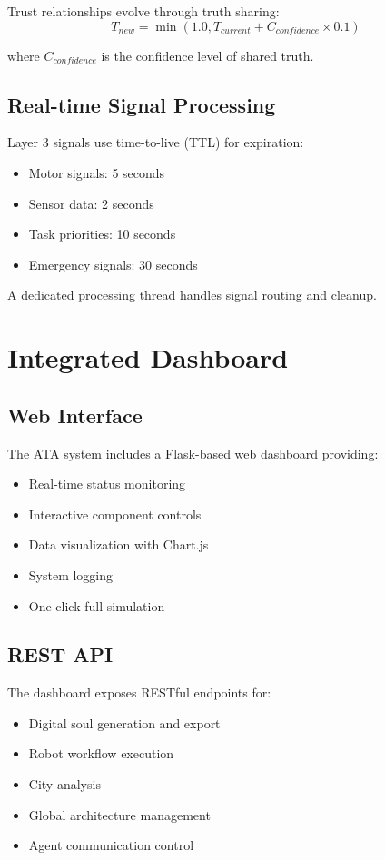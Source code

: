 \documentclass[12pt,a4paper]{article}
\begin{document}
\begin{itemize}
Trust relationships evolve through truth sharing:
\begin{equation}
T_{new} = \min(1.0, T_{current} + C_{confidence} \times 0.1)
\end{equation}

where $C_{confidence}$ is the confidence level of shared truth.

\subsection{Real-time Signal Processing}

Layer 3 signals use time-to-live (TTL) for expiration:
\begin{itemize}
    \item Motor signals: 5 seconds
    \item Sensor data: 2 seconds
    \item Task priorities: 10 seconds
    \item Emergency signals: 30 seconds
\end{itemize}

A dedicated processing thread handles signal routing and cleanup.

\section{Integrated Dashboard}

\subsection{Web Interface}

The ATA system includes a Flask-based web dashboard providing:
\begin{itemize}
    \item Real-time status monitoring
    \item Interactive component controls
    \item Data visualization with Chart.js
    \item System logging
    \item One-click full simulation
\end{itemize}

\subsection{REST API}

The dashboard exposes RESTful endpoints for:
\begin{itemize}
    \item Digital soul generation and export
    \item Robot workflow execution
    \item City analysis
    \item Global architecture management
    \item Agent communication control
\end{itemize}


\end{itemize}
\end{document}

